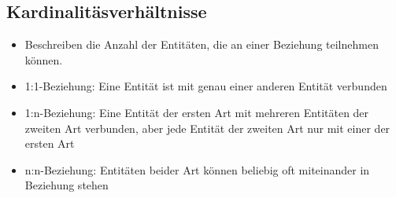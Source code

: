\subsection{Kardinalitäsverhältnisse}
    \begin{itemize}
        \item Beschreiben die Anzahl der Entitäten, die an einer Beziehung teilnehmen können.
        \item 1:1-Beziehung: Eine Entität ist mit genau einer anderen Entität verbunden
        \item 1:n-Beziehung: Eine Entität der ersten Art mit mehreren Entitäten der zweiten Art verbunden, aber jede Entität der zweiten Art nur mit einer der ersten Art
        \item n:n-Beziehung: Entitäten beider Art können beliebig oft miteinander in Beziehung stehen
    \end{itemize}